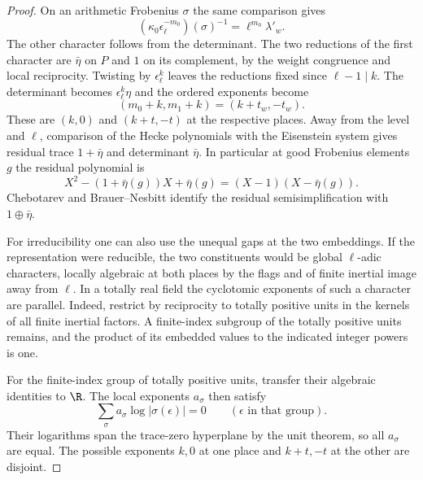 \begin{proof}
On an arithmetic Frobenius
\(\sigma\) the same comparison gives
\[
     (\kappa_0\epsilon_\ell^{-m_0})(\sigma)^{-1}
                 = \ell^{m_0}\lambda'_w .
\]
The other character follows from the determinant. The two reductions of
the first character are \(\bar\eta\) on \(P\) and \(1\)
on its complement, by the weight congruence and local
reciprocity. Twisting by \(\epsilon_\ell^k\) leaves the reductions fixed
since \(\ell-1\mid k\). The determinant becomes
\(\epsilon_\ell^k\eta\) and the ordered exponents become
\[
       (m_0+k,m_1+k)=(k+t_w,-t_w).
\]
These are \((k,0)\) and \((k+t,-t)\) at the respective places.
Away from the level and \(\ell\), comparison of the Hecke
polynomials with the Eisenstein system gives residual trace
\(1+\bar\eta\) and determinant \(\bar\eta\). In particular at good Frobenius elements \(g\) the residual polynomial is
\[
 X^2-(1+\bar\eta(g))X+\bar\eta(g)=(X-1)(X-\bar\eta(g)).
\]
Chebotarev and Brauer--Nesbitt identify the residual semisimplification with \(1\oplus\bar\eta\).
\hfill\mbox{\cite{skinner-hilbert,colmez-fontaine}}\label{cor:ordinary-mixed-hilbert-3}

For irreducibility one can also use the unequal gaps at the
two embeddings. If the representation were reducible, the
two constituents would be global \(\ell\)-adic characters,
locally algebraic at both places by the flags and of finite
inertial image away from \(\ell\). In a totally real field
the cyclotomic exponents of such a character are parallel.
Indeed, restrict by reciprocity to totally positive units in
the kernels of all finite inertial factors. A finite-index
subgroup of the totally positive units remains, and the
product of its embedded values to the indicated integer
powers is one.

For the finite-index group of totally positive units,
transfer their algebraic identities to \(\R\). The local
exponents \(a_\sigma\) then satisfy
\[
          \sum_\sigma a_\sigma\log|\sigma(\epsilon)|=0
                        \qquad(\epsilon\text{ in that group}).
\]
Their logarithms span the trace-zero hyperplane by the unit
theorem, so all \(a_\sigma\) are equal. The possible exponents \(k,0\) at one place and
\(k+t,-t\) at the other are disjoint.


\end{proof}
